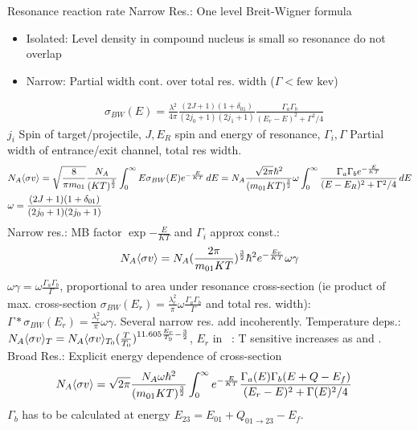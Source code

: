 \begin{frame}{Resonance reaction rate}
    Narrow Res.: One level Breit-Wigner formula
            \begin{itemize}
                \item Isolated: Level density in compound nucleus is small so resonance do not overlap
                \item Narrow: Partial width cont. over total res. width ($\Gamma<\text{few kev}$)
            \end{itemize}
            \begin{align*}
                &\sigma_{BW}(E)=\frac{\lambda^2}{4\pi}\frac{(2J+1)(1+\delta_{01})}{(2j_0+1)(2j_1+1)}\frac{\Gamma_a\Gamma_b}{(E_r-E)^2+\Gamma^2/4}
            \end{align*}
            $j_i$ Spin of target/projectile, $J,E_R$ spin and energy of resonance, $\Gamma_i,\Gamma$ Partial width of entrance/exit channel, total res width.
            \begin{align*}
                &N_A\langle \sigma v \rangle=\sqrt{\frac{8}{\pi m_{01}}}\frac{N_A}{(KT)^{\frac{3}{2}}}\int_0^{\infty}E\sigma_{BW}(E)e^{-\frac{E}{KT}}\,dE=N_A \frac{\sqrt{2\pi}\hbar^2}{(m_{01}KT)^{\frac{3}{2}}}\omega\int_0^{\infty}\frac{\Gamma_a\Gamma_be^{-\frac{E}{KT}}}{(E-E_R)^2+\Gamma^2/4}\,dE\\
                &\omega=\frac{(2J+1)(1+\delta_{01})}{(2j_0+1)(2j_0+1)}
            \end{align*}
            Narrow res.: MB factor $\exp{-\frac{E}{KT}}$ and $\Gamma_i$ approx const.:
            \begin{equation*}
            N_A\langle \sigma v \rangle=N_A(\frac{2\pi}{m_{01}KT})^{\frac{3}{2}}\hbar^2e^{-\frac{E_r}{KT}}\omega\gamma 
            \end{equation*}
            $\omega\gamma=\omega \frac{\Gamma_a\Gamma_b}{\Gamma}$, proportional to area under resonance cross-section (ie product of max. cross-section $\sigma_{BW}(E_r)=\frac{\lambda_r^2}{\pi}\omega \frac{\Gamma_a\Gamma_b}{\Gamma}$ and total res. width): $\Gamma*\sigma_{BW}(E_r)=\frac{\lambda_r^2}{\pi}\omega\gamma$. Several narrow res. add incoherently.
            Temperature deps.: $N_A\langle \sigma v \rangle_T=N_A\langle \sigma v \rangle_{T_0}(\frac{T}{T_0})^{\num{11.605}\frac{E_r}{T_9}-\frac{3}{2}}$, $E_r$ in \si{\mega\ev}: T sensitive increases as  and .
            Broad Res.: Explicit energy dependence of cross-section
            \begin{align*}
                &N_A\langle \sigma v \rangle=\sqrt{2\pi}\frac{N_A\omega\hbar^2}{(m_{01}KT)^{\frac{3}{2}}}\int_0^{\infty}e^{-\frac{E}{KT}}\frac{\Gamma_a(E)\Gamma_b(E+Q-E_f)}{(E_r-E)^2+\Gamma(E)^2/4}
            \end{align*}
            $\Gamma_b$ has to be calculated at energy $E_{23}=E_{01}+Q_{01\to23}-E_f$.
\end{frame}


